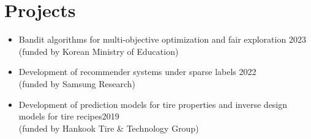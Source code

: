 
\section{Projects}

\begin{itemize}[nosep, wide=0pt]
    \item \small Bandit algorithms for multi-objective optimization and fair exploration \hfill 2023\textendash\\ \hspace{5mm}(funded by Korean Ministry of Education)
\end{itemize}
\begin{itemize}[nosep, wide=0pt]
    \item \small Development of recommender systems under sparse labels \hfill 2022\\ \hspace{5mm}(funded by Samsung Research)
\end{itemize}
\begin{itemize}[nosep, wide=0pt]
    \item \small Development of prediction models for tire properties and inverse design models for tire recipes\hfill 2019\\ \hspace{5mm}(funded by Hankook Tire \& Technology Group)
\end{itemize}



